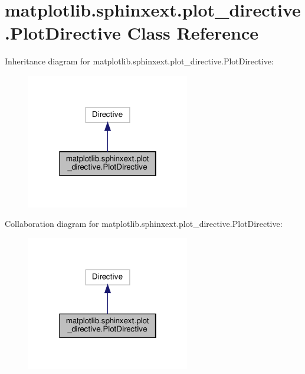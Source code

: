 \hypertarget{classmatplotlib_1_1sphinxext_1_1plot__directive_1_1PlotDirective}{}\section{matplotlib.\+sphinxext.\+plot\+\_\+directive.\+Plot\+Directive Class Reference}
\label{classmatplotlib_1_1sphinxext_1_1plot__directive_1_1PlotDirective}


Inheritance diagram for matplotlib.\+sphinxext.\+plot\+\_\+directive.\+Plot\+Directive\+:
\nopagebreak
\begin{figure}[H]
\begin{center}
\leavevmode
\includegraphics[width=202pt]{classmatplotlib_1_1sphinxext_1_1plot__directive_1_1PlotDirective__inherit__graph}
\end{center}
\end{figure}


Collaboration diagram for matplotlib.\+sphinxext.\+plot\+\_\+directive.\+Plot\+Directive\+:
\nopagebreak
\begin{figure}[H]
\begin{center}
\leavevmode
\includegraphics[width=202pt]{classmatplotlib_1_1sphinxext_1_1plot__directive_1_1PlotDirective__coll__graph}
\end{center}
\end{figure}
